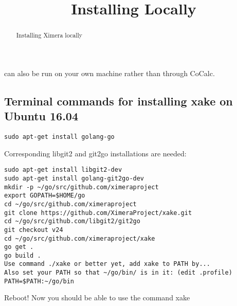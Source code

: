\documentclass{ximera}
\title{Installing Locally}
\begin{document}
\begin{abstract}
Installing Ximera locally
\end{abstract}
\maketitle


 can also be run on your own machine rather than through CoCalc.

\subsection{Terminal commands for installing xake on Ubuntu 16.04}
\begin{verbatim}
sudo apt-get install golang-go
\end{verbatim}
Corresponding libgit2 and git2go installations are needed:
\begin{verbatim}
sudo apt-get install libgit2-dev
sudo apt-get install golang-git2go-dev
mkdir -p ~/go/src/github.com/ximeraproject
export GOPATH=$HOME/go
cd ~/go/src/github.com/ximeraproject
git clone https://github.com/XimeraProject/xake.git
cd ~/go/src/github.com/libgit2/git2go
git checkout v24
cd ~/go/src/github.com/ximeraproject/xake
go get .
go build .
Use command ./xake or better yet, add xake to PATH by...
Also set your PATH so that ~/go/bin/ is in it: (edit .profile)
PATH=$PATH:~/go/bin
\end{verbatim}
Reboot!  Now you should be able to use the command xake
\end{document}
